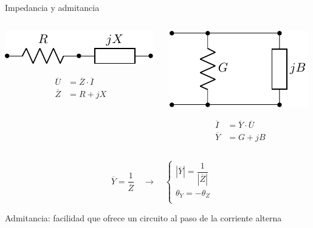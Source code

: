 \documentclass[aspectratio=169, usenames,svgnames,dvipsnames]{beamer}
\begin{document}

\begin{frame}{Impedancia y admitancia}
    \begin{columns}
    \begin{column}{0.5\columnwidth}

    \vspace{4mm}
    \begin{center}
        \includegraphics[height=0.12\textheight]{../figs/Z.pdf}
    \end{center}

    \vspace{2mm}
    \begin{align*}
      \overline{U} &= \overline{Z} \cdot \overline{I}\\
      \overline{Z} &= R + j X
    \end{align*}
    \end{column}
    
    \begin{column}{0.5\columnwidth}
    \begin{center}
        \includegraphics[height=0.25\textheight]{../figs/Y.pdf}
    \end{center}

    \vspace{-5mm}
    \begin{align*}
      \overline{I} &= \overline{Y} \cdot \overline{U}\\
      \overline{Y} &= G + j B
    \end{align*}
    \end{column}
    \end{columns}

    \vspace{5mm}
    \[
    \boxed{\quad 
      \overline{Y} = \frac{1}{\overline{Z}} \quad \rightarrow \quad \left\{%
        \begin{array}{l}
          |\overline{Y}| = \dfrac{1}{|\overline{Z}|}\\[12pt]
          \theta_Y = -\theta_Z \\
          \end{array}\right.
          }
    \]

    \alert{Admitancia}: facilidad que ofrece un circuito al paso de la corriente alterna 
\end{frame}
\end{document}
